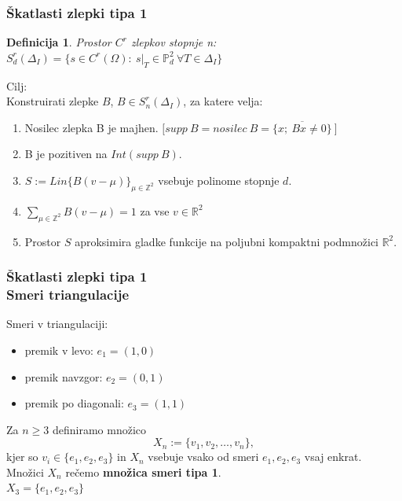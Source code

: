 \documentclass{beamer}
\newtheorem{definicija}{Definicija}
\begin{document}
\begin{frame}
\frametitle{Škatlasti zlepki tipa 1}

\begin{definicija}
Prostor $C^r$ zlepkov stopnje n: $S_d^r(\Delta_I) = \{ s \in C^r(\Omega):\ s|_T \in \mathbb{P}_d^2\  \forall T \in  \Delta_I\}$
\end{definicija}

\vspace{5mm}
Cilj: \\
Konstruirati zlepke $B$, $B \in S_n^r (\Delta_I)$, za katere velja:
\begin{enumerate}
\item Nosilec zlepka B je majhen.  $\big[ supp\ B = nosilec\ B = \overline{\{x;\ Bx \neq 0\}}\ \big] $
\item B je pozitiven na $Int(supp\ B)$.
\item $S := Lin \{ B(v-\mu)  \}_{\mu \in \mathbb{Z}^2}$ vsebuje polinome stopnje $d$.
\item $\sum_{\mu \in \mathbb{Z}^2} B(v-\mu)  = 1$ za vse $v \in \mathbb{R}^2$
\item Prostor $S$ aproksimira gladke funkcije na poljubni kompaktni podmnožici $\mathbb{R}^2$.
\end{enumerate}

\end{frame}


\begin{frame}
\frametitle{Škatlasti zlepki tipa 1 \\ Smeri triangulacije}

Smeri v triangulaciji:
\begin{itemize}
\item premik v levo: $e_1 = (1,0)$
\item premik navzgor: $e_2 = (0,1)$
\item premik po diagonali: $e_3 = (1,1)$
\end{itemize}

\vspace{5mm}

Za $n \geq 3$ definiramo množico  $$X_n := \{v_1, v_2, \ldots , v_n\},$$ kjer so $v_i \in \{e_1, e_2, e_3\}$ in $X_n$ vsebuje vsako od smeri $e_1, e_2, e_3$ vsaj enkrat. \\
Množici $X_n$ rečemo \textbf{množica smeri tipa 1}.\\
\vspace{4mm}
$X_3 = \{e_1,e_2, e_3\}$
\end{frame}
\end{document}
